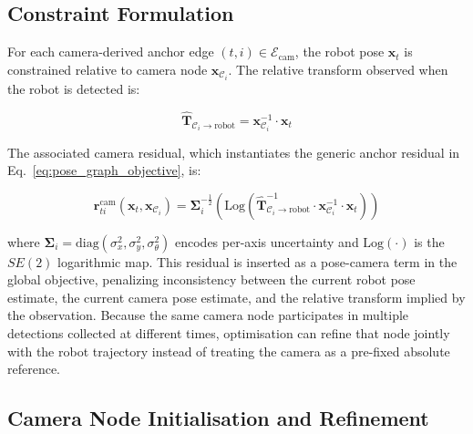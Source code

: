 \subsection{Constraint Formulation}
\label{sec:constraint}

For each camera-derived anchor edge $(t,i) \in \mathcal{E}_{\mathrm{cam}}$,
the robot pose $\mathbf{x}_t$ is constrained relative to camera node
$\mathbf{x}_{\mathcal{C}_i}$.
The relative transform observed when the robot is detected is:

\begin{equation}
    \hat{\mathbf{T}}_{\mathcal{C}_i \to \text{robot}} =
        \mathbf{x}_{\mathcal{C}_i}^{-1} \cdot \mathbf{x}_t
    \label{eq:relative_transform}
\end{equation}

The associated camera residual, which instantiates the generic anchor residual
in Eq.~\ref{eq:pose_graph_objective}, is:

\begin{equation}
    \mathbf{r}^{\mathrm{cam}}_{ti}(\mathbf{x}_t, \mathbf{x}_{\mathcal{C}_i}) =
        \boldsymbol{\Sigma}_i^{-\frac{1}{2}}
        \left(
            \text{Log}\!\left(
                \hat{\mathbf{T}}_{\mathcal{C}_i \to \text{robot}}^{-1}
                \cdot \mathbf{x}_{\mathcal{C}_i}^{-1} \cdot \mathbf{x}_t
            \right)
        \right)
    \label{eq:residual}
\end{equation}

\noindent where $\boldsymbol{\Sigma}_i = \text{diag}(\sigma_x^2, \sigma_y^2, \sigma_\theta^2)$
encodes per-axis uncertainty and $\text{Log}(\cdot)$ is the $SE(2)$
logarithmic map.
This residual is inserted as a pose-camera term in the global objective,
penalizing inconsistency between the current robot pose estimate, the current
camera pose estimate, and the relative transform implied by the observation.
Because the same camera node participates in multiple detections collected at
different times, optimisation can refine that node jointly with the robot
trajectory instead of treating the camera as a pre-fixed absolute reference.

\subsection{Camera Node Initialisation and Refinement}
\label{sec:cam_init}

